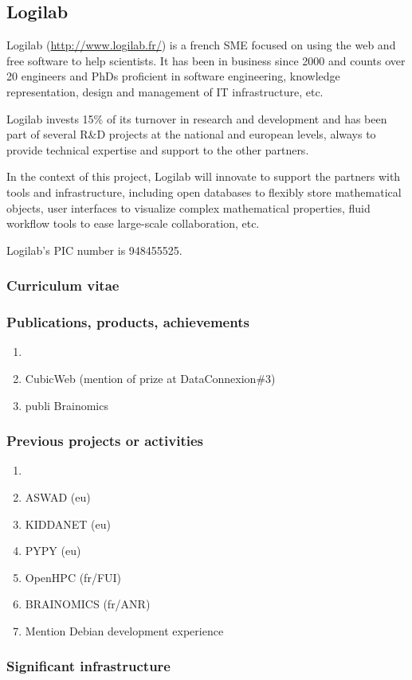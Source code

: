 \subsection*{Logilab}

Logilab (\url{http://www.logilab.fr/}) is a french SME focused on using the web and free software to help
scientists. It has been in business since 2000 and counts over 20 engineers and
PhDs proficient in software engineering, knowledge representation, design and
management of IT infrastructure, etc.

Logilab invests 15\% of its turnover in research and development and has been
part of several R\&D projects at the national and european levels, always to
provide technical expertise and support to the other partners.

In the context of this project, Logilab will innovate to support the partners
with tools and infrastructure, including open databases to flexibly store
mathematical objects, user interfaces to visualize complex mathematical
properties, fluid workflow tools to ease large-scale collaboration, etc.

Logilab's PIC number is 948455525.


\subsubsection*{Curriculum vitae}


%
%
%

\subsubsection*{Publications, products, achievements}

\begin{enumerate}
\item {}
\item CubicWeb (mention of prize at DataConnexion\#3)
\item publi Brainomics
\end{enumerate}

\subsubsection*{Previous projects or activities}

\begin{enumerate}
\item {}
\item ASWAD (eu)
\item KIDDANET (eu)
\item PYPY (eu)
\item OpenHPC (fr/FUI)
\item BRAINOMICS (fr/ANR)
\item Mention Debian development experience
\end{enumerate}

\subsubsection*{Significant infrastructure}

